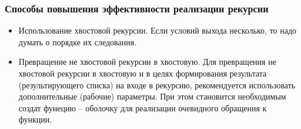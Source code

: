 \subsubsection{Способы повышения эффективности реализации рекурсии}

\begin{itemize}
    \item Использование хвостовой рекурсии.
        Если условий выхода несколько, то надо думать о порядке их следования.
    \item Превращение не хвостовой рекурсии в хвостовую.
        Для превращения не хвостовой рекурсии в хвостовую и в целях
        формирования результата (результирующего списка) на входе в
        рекурсию, рекомендуется использовать дополнительные (рабочие)
        параметры. При этом становится необходимым создат фунецию --
        оболочку для реализации очевидного обращения к функции.
\end{itemize}
